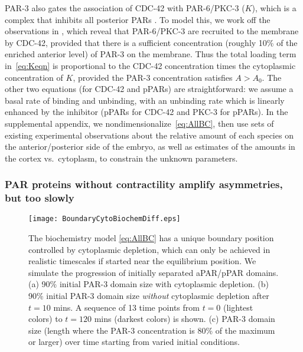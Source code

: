 \documentclass[11pt]{article}
\newcommand{\6}[1]{#1_{\text{6}}}
\newcommand{\3}[1]{#1_{\text{3}}}
\begin{document}
PAR-3 also gates the association of CDC-42 with PAR-6/PKC-3 ($K$), which is a complex that inhibits all posterior PARs \cite{lang2017proteins}. To model this, we work off the observations in \cite{sailer2015dynamic}, which reveal that PAR-6/PKC-3 are recruited to the membrane by CDC-42, provided that there is a sufficient concentration (roughly 10\% of the enriched anterior level) of PAR-3 on the membrane. Thus the total loading term in\ \eqref{eq:Keqn} is proportional to the CDC-42 concentration times the cytoplasmic concentration of $K$, provided the PAR-3 concentration satisfies $A > A_0$. The other two equations (for CDC-42 and pPARs) are straightforward: we assume a basal rate of binding and unbinding, with an unbinding rate which is linearly enhanced by the inhibitor (pPARs for CDC-42 and PKC-3 for pPARs). In the supplemental appendix, we nondimensionalize\ \eqref{eq:AllBC}, then use sets of existing experimental observations about the relative amount of each species on the anterior/posterior side of the embryo, as well as estimates of the amounts in the cortex vs.\ cytoplasm, to constrain the unknown parameters. 

\subsubsection{PAR proteins without contractility amplify asymmetries, but too slowly}

\begin{figure}
\centering
\texttt{[image: BoundaryCytoBiochemDiff.eps]}
\caption{\label{fig:BoundaryDiff}The biochemistry model \eqref{eq:AllBC} has a unique boundary position controlled by cytoplasmic depletion, which can only be achieved in realistic timescales if started near the equilibrium position. We simulate the progression of initially separated aPAR/pPAR domains. (a) 90\% initial PAR-3 domain size with cytoplasmic depletion. (b) 90\% initial PAR-3 domain size \emph{without} cytoplasmic depletion after $t=10$ mins. A sequence of 13 time points from $t = 0$ (lightest colors) to $ t = 120$ mins (darkest colors) is shown. (c) PAR-3 domain size (length where the PAR-3 concentration is 80\% of the maximum or larger) over time starting from varied initial conditions. }
\end{figure}
\end{document}
